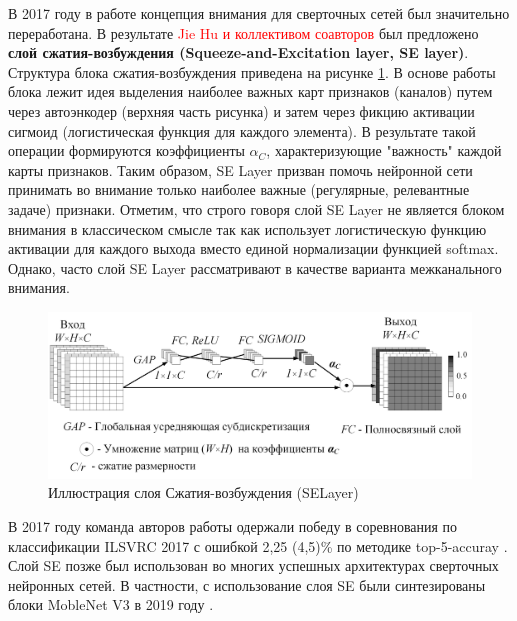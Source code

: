 \documentclass[12pt]{article}
\begin{document}
\begin{sloppypar}
В 2017 году в работе \cite{hu2018squeeze} концепция внимания для сверточных сетей был значительно переработана. В результате 
\textcolor{red}{Jie Hu и коллективом соавторов}  был предложено \textbf{слой сжатия-возбуждения (Squeeze-and-Excitation layer, SE layer)}. Структура блока сжатия-возбуждения приведена на рисунке \ref{ch1:fig:senet}. В основе работы блока лежит идея выделения наиболее важных карт признаков (каналов) путем через автоэнкодер (верхняя часть рисунка) и затем через фикцию активации сигмоид (логистическая функция для каждого элемента). В результате такой операции формируются коэффициенты $\alpha_C$, характеризующие "важность" каждой карты признаков. Таким образом, SE Layer призван помочь нейронной сети принимать во внимание только наиболее важные (регулярные, релевантные задаче) признаки. 
Отметим, что строго говоря слой SE Layer не является блоком внимания в классическом смысле так как использует логистическую функцию активации для каждого выхода вместо единой нормализации функцией softmax. Однако, часто слой SE Layer рассматривают в качестве варианта межканального внимания. 

\begin{figure}[!h]
	\begin{center}
		\includegraphics[width=0.99\linewidth]{./figuresch1/SELayer.png}
		\caption{Иллюстрация слоя Сжатия-возбуждения (SELayer)}	\label{ch1:fig:senet}
	\end{center}
\end{figure}

В 2017 году команда авторов работы \cite{hu2018squeeze} одержали победу в соревнования по классификации ILSVRC 2017 с ошибкой 2,25 (4,5)\% по методике top-5-accuray \cite{hu2018squeeze}. Слой SE позже был использован во многих успешных архитектурах сверточных нейронных сетей. В частности, с использование слоя SE были синтезированы блоки MobleNet V3 в 2019 году \cite{howard2019searching}.




\end{sloppypar}
\end{document}
